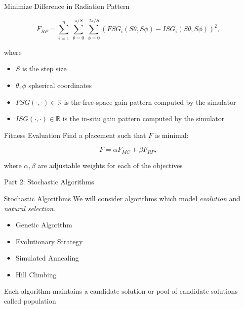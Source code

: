 \documentclass{beamer}
\begin{document}
\begin{frame}{Minimize Difference in Radiation Pattern}
    \begin{tcolorbox}[colback=green!5]
        \begin{equation} \label{eq:rp}
            F_{RP} = \sum_{i=1}^n~\sum_{\theta=0}^{\pi/S}~\sum_{\phi=0}^{2\pi/S}
            \left( FSG_i(S\theta,S\phi) - ISG_i(S\theta,S\phi) \right) ^2,
        \end{equation}
    \end{tcolorbox}
    where
    \begin{itemize}
            \small
        \item $S$ is the step size
        \item $\theta, \phi$ spherical coordinates
        \item $FSG(\cdot,\cdot) \in \mathbb R$ is the free-space gain pattern computed by the simulator
        \item $ISG(\cdot,\cdot) \in \mathbb R$ is the in-situ gain pattern computed by the simulator
    \end{itemize}
\end{frame}

\begin{frame}{Fitness Evaluation}
    Find a placement such that $F$ is minimal:
    \begin{tcolorbox}[colback=green!5]
        \begin{equation} \label{eq:optimal}
            F = \alpha F_{MC} + \beta F_{RP},
        \end{equation}
    \end{tcolorbox}
    where $\alpha, \beta$ are adjustable weights for each of the objectives 
\end{frame}

\begin{frame}{\null}
    \begin{tcolorbox}[colback=green!5]
        \centering\Huge
        Part 2: Stochastic Algorithms
    \end{tcolorbox}
\end{frame}

\begin{frame}[t]{Stochastic Algorithms}
    We will consider algorithms which model \textit{evolution} and \textit{natural selection}.
    \vspace{10px}
\begin{itemize} \itemsep1.5em
        \item Genetic Algorithm
        \item Evolutionary Strategy
        \item Simulated Annealing
        \item Hill Climbing
    \end{itemize}
    \vspace{5mm}
    Each algorithm maintains a candidate solution or pool of candidate solutions called population
\end{frame}
\end{document}
